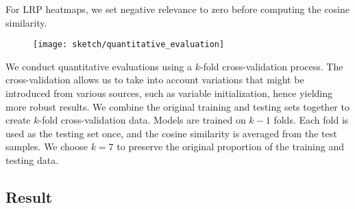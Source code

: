For LRP heatmaps, we set negative relevance to zero before computing the cosine similarity.

\begin{figure}[!htb]
\centering
\texttt{[image: sketch/quantitative\_evaluation]}
\label{fig:quantitative_evaluation}
\end{figure}

We conduct quantitative evaluations using a $k$-fold cross-validation process. The cross-validation allows us to take into account variations that might be introduced from various sources, such as variable initialization, hence yielding more robust results. We combine the original training and testing sets together to create $k$-fold cross-validation data. Models are trained on $k-1$ folds. Each fold is used as the testing set once, and the cosine similarity is averaged from the test samples.  We choose $k=7$ to preserve the original proportion of the training and testing data.








\subsection{Result}

